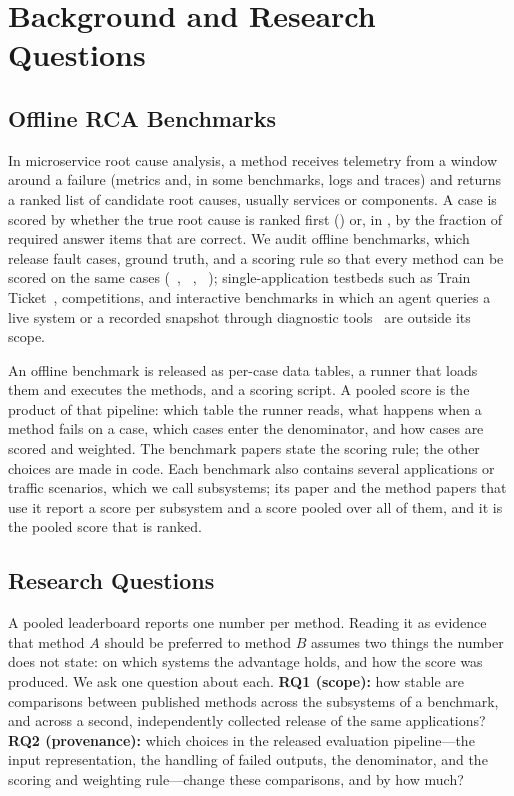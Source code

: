 \section{Background and Research Questions}
\label{sec:background}

\subsection{Offline RCA Benchmarks}
\label{sec:bg-bench}

In microservice root cause analysis, a method receives telemetry from a window around a failure (metrics and, in some benchmarks, logs and traces) and returns a ranked list of candidate root causes, usually services or components.
A case is scored by whether the true root cause is ranked first (\acc) or, in \openrca, by the fraction of required answer items that are correct.
We audit offline benchmarks, which release fault cases, ground truth, and a scoring rule so that every method can be scored on the same cases (\openrca~\citep{xu2025openrca}, \rcaeval~\citep{pham2024rcaeval}, \petshop~\citep{hardt2024petshop}); single-application testbeds such as Train Ticket~\citep{zhou2018trainticket}, competitions, and interactive benchmarks in which an agent queries a live system or a recorded snapshot through diagnostic tools~\citep{aiopslab,jha2025itbench,wang2026cloudopsbench} are outside its scope.

An offline benchmark is released as per-case data tables, a runner that loads them and executes the methods, and a scoring script.
A pooled score is the product of that pipeline: which table the runner reads, what happens when a method fails on a case, which cases enter the denominator, and how cases are scored and weighted.
The benchmark papers state the scoring rule; the other choices are made in code.
Each benchmark also contains several applications or traffic scenarios, which we call subsystems; its paper and the method papers that use it report a score per subsystem and a score pooled over all of them, and it is the pooled score that is ranked.

\subsection{Research Questions}
\label{sec:rqs}

A pooled leaderboard reports one number per method. Reading it as evidence that method $A$ should be preferred to method $B$ assumes two things the number does not state: on which systems the advantage holds, and how the score was produced. We ask one question about each.
\textbf{RQ1 (scope):} how stable are comparisons between published methods across the subsystems of a benchmark, and across a second, independently collected release of the same applications?
\textbf{RQ2 (provenance):} which choices in the released evaluation pipeline---the input representation, the handling of failed outputs, the denominator, and the scoring and weighting rule---change these comparisons, and by how much?
